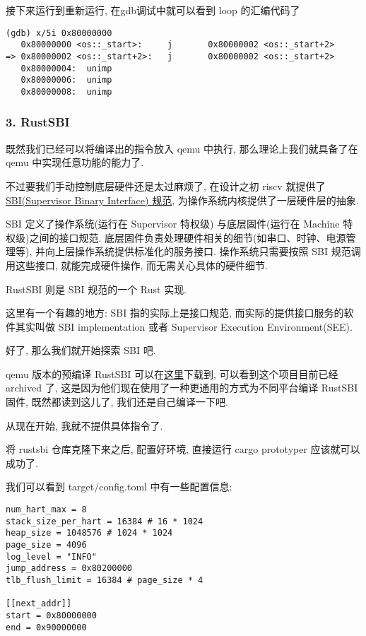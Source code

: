 \documentclass[a4paper]{ctexart}
\begin{document}
接下来运行到重新运行,
在gdb调试中就可以看到 loop 的汇编代码了
\begin{lstlisting}
(gdb) x/5i 0x80000000
   0x80000000 <os::_start>:     j       0x80000002 <os::_start+2>
=> 0x80000002 <os::_start+2>:   j       0x80000002 <os::_start+2>
   0x80000004:  unimp
   0x80000006:  unimp
   0x80000008:  unimp
\end{lstlisting}

\subsubsection{3. RustSBI}
既然我们已经可以将编译出的指令放入 qemu 中执行,
那么理论上我们就具备了在 qemu 中实现任意功能的能力了.

不过要我们手动控制底层硬件还是太过麻烦了,
在设计之初 riscv 就提供了
\href{https://github.com/riscv-non-isa/riscv-sbi-doc}
{SBI(Supervisor Binary Interface) 规范},
为操作系统内核提供了一层硬件层的抽象.

SBI 定义了操作系统(运行在 Supervisor 特权级)
与底层固件(运行在 Machine 特权级)之间的接口规范.
底层固件负责处理硬件相关的细节(如串口、时钟、电源管理等),
并向上层操作系统提供标准化的服务接口.
操作系统只需要按照 SBI 规范调用这些接口,
就能完成硬件操作, 而无需关心具体的硬件细节.

RustSBI 则是 SBI 规范的一个 Rust 实现.

这里有一个有趣的地方:
SBI 指的实际上是接口规范,
而实际的提供接口服务的软件其实叫做
SBI implementation 或者
Supervisor Execution Environment(SEE).

好了, 那么我们就开始探索 SBI 吧.

qemu 版本的预编译 RustSBI 可以在\href{https://github.com/rustsbi/rustsbi-qemu/releases}{这里}下载到,
可以看到这个项目目前已经 archived 了,
这是因为他们现在使用了一种更通用的方式为不同平台编译
RustSBI 固件, 既然都读到这儿了, 我们还是自己编译一下吧.

从现在开始, 我就不提供具体指令了.

将 rustsbi 仓库克隆下来之后,
配置好环境,
直接运行 cargo prototyper 应该就可以成功了.

我们可以看到 target/config.toml 中有一些配置信息:
\begin{lstlisting}
num_hart_max = 8
stack_size_per_hart = 16384 # 16 * 1024
heap_size = 1048576 # 1024 * 1024
page_size = 4096
log_level = "INFO"
jump_address = 0x80200000
tlb_flush_limit = 16384 # page_size * 4

[[next_addr]]
start = 0x80000000
end = 0x90000000
\end{lstlisting}
\end{document}
